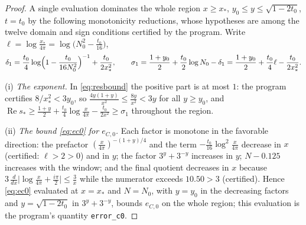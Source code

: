 \documentclass[11pt]{article}
\theoremstyle{definition}
\DeclareMathOperator{\Rea}{Re}
\begin{document}
\begin{proof}
A single evaluation dominates the whole region $x\ge x_*$,
$y_0\le y\le\sqrt{1-2t_0}$, $t=t_0$ by the following monotonicity
reductions, whose hypotheses are among the twelve domain and sign
conditions certified by the program. Write
$\ell=\log\frac{x_*}{4\pi}=\log\bigl(N_0^2-\tfrac{t_0}{16}\bigr)$,
\[
\delta_1=\frac{t_0}4\log\Bigl(1-\frac{t_0}{16N_0^2}\Bigr)^{-1}
+\frac{t_0}{2x_*^2},
\qquad
\sigma_1=\frac{1+y_0}2+\frac{t_0}2\log N_0-\delta_1
=\frac{1+y_0}2+\frac{t_0}4\ell-\frac{t_0}{2x_*^2}.
\]

(i) \emph{The exponent.} In \eqref{eq:resbound} the positive part
is at most $1$: the program certifies $8/x_*^2<3y_0$, so
$\frac{4y(1+y)}{x^2}\le\frac{8y}{x^2}<3y$ for all $y\ge y_0$, and
$\Rea s_*\ge\frac{1+y}2+\frac{t_0}4\log\frac x{4\pi}
-\frac{t_0}{2x^2}\ge\sigma_1$ throughout the region.

(ii) \emph{The bound \eqref{eq:ec0} for $e_{C,0}$.} Each factor is
monotone in the favorable direction: the prefactor
$(\frac x{4\pi})^{-(1+y)/4}$ and the term
$-\frac{t_0}{16}\log^2\frac x{4\pi}$ decrease in $x$ (certified:
$\ell>2>0$) and in $y$; the factor $3^y+3^{-y}$ increases in $y$;
$N-0.125$ increases with the window; and the final quotient
decreases in $x$ because
$3\,\frac{d}{dx}\bigl|\log\tfrac x{4\pi}+\tfrac{i\pi}2\bigr|
\le\frac3x$ while the numerator exceeds $10.50>3$ (certified).
Hence \eqref{eq:ec0} evaluated at $x=x_*$ and $N=N_0$, with $y=y_0$
in the decreasing factors and $y=\sqrt{1-2t_0}$ in $3^y+3^{-y}$,
bounds $e_{C,0}$ on the whole region; this evaluation is the
program's quantity \texttt{error\_c0}.


\end{proof}
\end{document}
